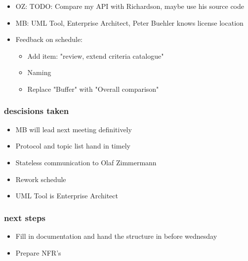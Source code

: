 \begin{itemize}
\begin{itemize}
        \end{itemize}
    \item OZ: TODO: Compare my API with Richardson, maybe use his source code
    \item MB: UML Tool, Enterprise Architect, Peter Buehler knows license location
    \item Feedback on schedule:
        \begin{itemize}
            \item Add item: "review, extend criteria catalogue"
            \item Naming
            \item Replace "Buffer" with "Overall comparison"
        \end{itemize}
\end{itemize}

\subsubsection{descisions taken}
\begin{itemize}
    \item MB will lead next meeting definitively
    \item Protocol and topic list hand in timely
    \item Stateless communication to Olaf Zimmermann
    \item Rework schedule
    \item UML Tool is Enterprise Architect
\end{itemize}

\subsubsection{next steps}
\begin{itemize}
    \item Fill in documentation and hand the structure in before wednesday
    \item Prepare NFR's
\end{itemize}